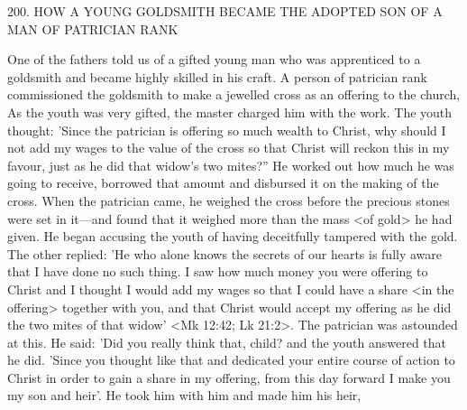 200.
HOW A YOUNG GOLDSMITH BECAME THE ADOPTED SON OF A MAN OF PATRICIAN RANK

One of the fathers told us of a gifted young man who was apprenticed to a goldsmith and became highly skilled in his craft.
A person of patrician rank commissioned the goldsmith to make a jewelled cross as an offering to the church, As the youth was very gifted, the
master charged him with the work.
The youth thought: 'Since the patrician is offering so much wealth to Christ, why should I not add
my wages to the value of the cross so that Christ will reckon this in my favour, just as he did that widow's two mites?” He worked out how much he was going to receive, borrowed that amount and disbursed it on the making of the cross.
When the patrician came, he weighed the cross before the precious stones were set in it—and found that it weighed more than the mass <of gold> he had given.
He began accusing the youth of having deceitfully tampered with the gold.
The other replied: 'He who alone knows the secrets of our hearts is fully aware that I have done no such thing.
I saw how much money you were offering to Christ and I thought I would add my wages so that I could have a share <in the offering> together with you, and that Christ would accept my offering as he did the two mites of that widow' <Mk 12:42; Lk 21:2>.
The patrician was astounded at this.
He said: 'Did you really think that, child? and the youth answered that he did.
'Since you thought like that and dedicated your entire course of action to Christ in order to gain a share in my offering, from this day forward I make you my son and heir'.
He took him with him and made him his heir,
